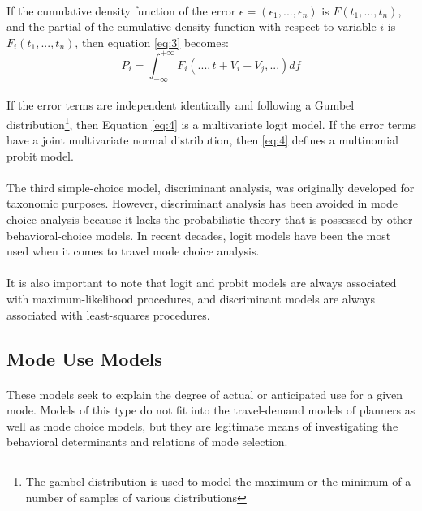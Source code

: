 \paragraph{}If the cumulative density function of the error $\epsilon =(\epsilon_1, . . . , \epsilon_n)$ is $F(t_1, . . . , t_n)$, and the partial of the cumulative density function with respect to variable $i$ is $F_i(t_1, . . . , t_n)$, then equation \ref{eq:3} becomes:
\begin{equation}\label{eq:4}
P_i = 	\int_{-\infty}^{+\infty} F_i(. . . , t + V_i - V_j, . . .)df
\end{equation}
\paragraph{}If the error terms are independent identically  and following a Gumbel distribution\footnote{The gambel distribution is used to model the maximum or the minimum of a number of samples of various distributions}, then Equation \ref{eq:4} is a multivariate logit model. If the error terms have a joint multivariate normal distribution, then \ref{eq:4} defines a multinomial probit model. 
\paragraph{}The third simple-choice model, discriminant analysis, was originally developed for taxonomic purposes. However, discriminant analysis has been avoided in mode choice analysis because it lacks the probabilistic theory that is possessed by other behavioral-choice models. In recent decades, logit models have been the most used when it comes to travel mode choice analysis.
\paragraph{}It is also important to note that logit and probit models are always associated with maximum-likelihood procedures, and discriminant models are always associated with least-squares procedures.

\subsection{Mode Use Models}
\paragraph{}These models seek to explain the degree of actual or anticipated use for a given mode. Models of this type do not fit into the travel-demand models of planners as well as mode choice models, but they are legitimate means of investigating the behavioral determinants and relations of mode selection.
